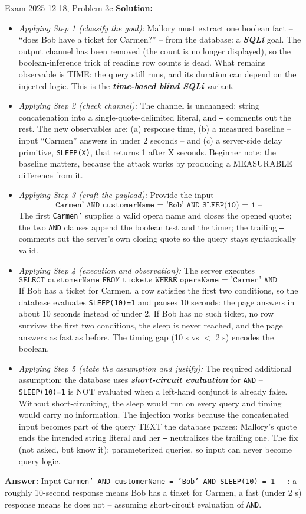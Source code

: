 \documentclass[12pt, a4paper]{article}
\newcommand{\term}[1]{\textbf{\textit{#1}}}        %
\begin{document}
\begin{practicebox}{Exam 2025-12-18, Problem 3c}
\textbf{Solution:}
\begin{itemize}
    \item \textit{Applying Step 1 (classify the goal):} Mallory must extract one boolean fact -- ``does Bob have a ticket for Carmen?'' -- from the database: a \term{SQLi} goal. The output channel has been removed (the count is no longer displayed), so the boolean-inference trick of reading row counts is dead. What remains observable is TIME: the query still runs, and its duration can depend on the injected logic. This is the \term{time-based blind SQLi} variant.
    \item \textit{Applying Step 2 (check channel):} The channel is unchanged: string concatenation into a single-quote-delimited literal, and \texttt{--} comments out the rest. The new observables are: (a) response time, (b) a measured baseline -- input ``Carmen'' answers in under 2 seconds -- and (c) a server-side delay primitive, \texttt{SLEEP(X)}, that returns 1 after X seconds. Beginner note: the baseline matters, because the attack works by producing a MEASURABLE difference from it.
    \item \textit{Applying Step 3 (craft the payload):} Provide the input
\[ \texttt{Carmen' AND customerName = 'Bob' AND SLEEP(10) = 1 -- } \]
The first \texttt{Carmen'} supplies a valid opera name and closes the opened quote; the two \texttt{AND} clauses append the boolean test and the timer; the trailing \texttt{--} comments out the server's own closing quote so the query stays syntactically valid.
    \item \textit{Applying Step 4 (execution and observation):} The server executes
\[ \texttt{SELECT customerName FROM tickets WHERE operaName = 'Carmen' AND customerName = 'Bob' AND SLEEP(10) = 1} \]
If Bob has a ticket for Carmen, a row satisfies the first two conditions, so the database evaluates \texttt{SLEEP(10)=1} and pauses 10 seconds: the page answers in about 10 seconds instead of under 2. If Bob has no such ticket, no row survives the first two conditions, the sleep is never reached, and the page answers as fast as before. The timing gap (10 s vs \(<\) 2 s) encodes the boolean.
    \item \textit{Applying Step 5 (state the assumption and justify):} The required additional assumption: the database uses \term{short-circuit evaluation} for \texttt{AND} -- \texttt{SLEEP(10)=1} is NOT evaluated when a left-hand conjunct is already false. Without short-circuiting, the sleep would run on every query and timing would carry no information. The injection works because the concatenated input becomes part of the query TEXT the database parses: Mallory's quote ends the intended string literal and her \texttt{--} neutralizes the trailing one. The fix (not asked, but know it): parameterized queries, so input can never become query logic.
\end{itemize}
\textbf{Answer:} Input \texttt{Carmen' AND customerName = 'Bob' AND SLEEP(10) = 1 -- }: a roughly 10-second response means Bob has a ticket for Carmen, a fast (under 2 s) response means he does not -- assuming short-circuit evaluation of \texttt{AND}.
\end{practicebox}
\end{document}

